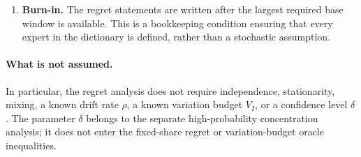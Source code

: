 \documentclass[11pt]{article}
\newcommand{\1}{\mathbf{1}}
\begin{document}
\begin{enumerate}[leftmargin=*]
    \item \textbf{Burn-in.}
    The regret statements are written after the largest required base window
    is available.  This is a bookkeeping condition ensuring that every expert
    in the dictionary is defined, rather than a stochastic assumption.

\end{enumerate}

\paragraph{What is not assumed.}
In particular, the regret analysis does not require independence, stationarity,
mixing, a known drift rate $\rho$, a known variation budget $V_I$, or a
confidence level $\delta$.  The parameter $\delta$ belongs to the separate
high-probability concentration analysis; it does not enter the fixed-share
regret or variation-budget oracle inequalities.
\end{document}
